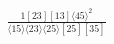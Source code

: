 \documentclass[varwidth, border=5pt]{standalone}
\begin{document}
\begin{my}
$\begin{gathered}
\scriptscriptstyle\frac{1[23][13]⟨45⟩^2}{⟨15⟩⟨23⟩⟨25⟩[25][35]}
\end{gathered}$
\end{my}
\end{document}
